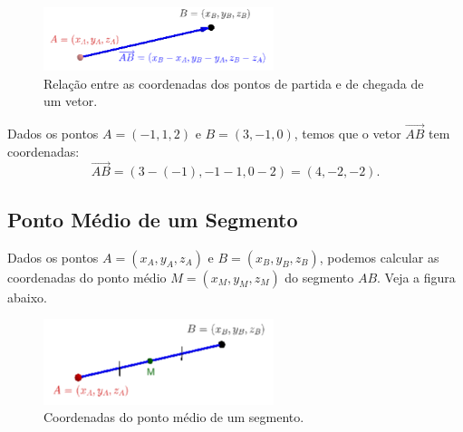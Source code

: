 \begin{figure}[H]
\centering
\includegraphics[width=0.6\textwidth]{./cap_estudo/dados/fig_scoord_vec_pt/fig}
\caption{Relação entre as coordenadas dos pontos de partida e de chegada de um vetor.}
\label{fig:scoord_vec_pt}
\end{figure}  

\begin{ex}
  Dados os pontos $A = (-1,1,2)$ e $B = (3,-1,0)$, temos que o vetor $\overrightarrow{AB}$ tem coordenadas:
  \begin{equation}
    \overrightarrow{AB} = (3-(-1),-1-1,0-2) = (4,-2,-2).
  \end{equation}
\end{ex}

\subsection{Ponto Médio de um Segmento}


Dados os pontos $A = (x_A,y_A,z_A)$ e $B = (x_B,y_B,z_B)$, podemos calcular as coordenadas do ponto médio $M = (x_M,y_M,z_M)$ do segmento $AB$. Veja a figura abaixo.

\begin{figure}[H]
\centering
\includegraphics[width=0.6\textwidth]{./cap_estudo/dados/fig_scoord_pm/fig}
\caption{Coordenadas do ponto médio de um segmento.}
\label{fig:scoord_pm}
\end{figure}  

